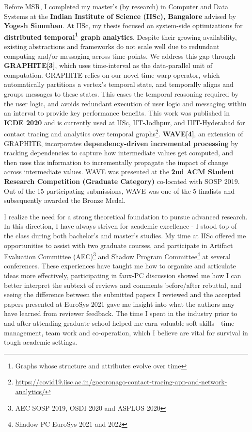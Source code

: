 \documentclass{article}
\newcommand{\graphite}{GRAPHITE\xspace}
\newcommand{\wave}{WAVE\xspace}
\begin{document}
Before MSR, I completed my master's (by research) in Computer and Data Systems at the \textbf{Indian Institute of Science (IISc), Bangalore} advised by \textbf{Yogesh Simmhan}. At IISc, my thesis focused on system-side optimizations for \textbf{distributed temporal\footnote{Graphs whose structure and attributes evolve over time} graph analytics}.
Despite their growing availability, existing abstractions and frameworks do not scale well due to redundant computing and/or messaging across time-points.
We address this gap through \textbf{\graphite[3]}, which uses time-interval as the data-parallel unit of computation.
\graphite relies on our novel time-warp operator, which automatically partitions a vertex’s temporal state, and temporally aligns and groups messages to these states. This eases the temporal reasoning required by the user logic, and avoids redundant execution of user logic and messaging within an interval to provide key performance benefits.
This work was published in \textbf{ICDE 2020} and is currently used at IISc, IIT-Jodhpur, and IIIT-Hyderabad for contact tracing and analytics over temporal graphs\footnote{\url{https://covid19.iisc.ac.in/gocoronago-contact-tracing-app-and-network-analytics/}}.
\textbf{\wave[4]}, an extension of \graphite, incorporates \textbf{dependency-driven incremental processing} by tracking dependencies to capture how intermediate values get computed, and then uses this information to incrementally propagate the impact of change across intermediate values.
\wave was presented at the \textbf{2nd ACM Student Research Competition (Graduate Category)} co-located with SOSP 2019. Out of the 15 participating submissions, \wave was one of the 5 finalists and subsequently awarded the Bronze Medal.


I realize the need for a strong theoretical foundation to pursue advanced research. In this direction, I have always striven for academic excellence - I stood top of the class during both bachelor's and master's studies.
My time at IISc offered me opportunities to assist with two graduate courses, and participate in Artifact Evaluation Committee (AEC)\footnote{AEC SOSP 2019, OSDI 2020 and ASPLOS 2020} and Shadow Program Committee\footnote{Shadow PC EuroSys 2021 and 2022} at several conferences. These experiences have taught me how to organize and articulate ideas more effectively, participating in faux-PC discussion showed me how I can better interpret the subtext of reviews and comments before/after rebuttal, and seeing the difference between the submitted papers I reviewed and the accepted papers presented at EuroSys 2021 gave me insight into what the authors may have learned from reviewer feedback.
The time I spent in the industry prior to and after attending graduate school helped me earn valuable soft skills - time management, team work and co-operation, which I believe are vital for survival in tough academic settings.
\end{document}
